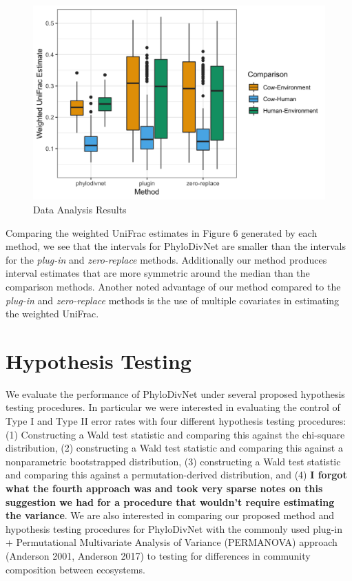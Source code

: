 \documentclass{article}
\newcommand*{\myfont}{\fontfamily{lmtt}\selectfont}
\begin{document}
\begin{figure}[!htb]
 \captionsetup{singlelinecheck = false, format= hang, justification = raggedright, font = sf, labelsep = space}
  \caption{Data Analysis Results}
  \centering
  \includegraphics[width=\textwidth]{HDWanalysis_plots_B100_3methods.png}
\end{figure}

Comparing the weighted UniFrac estimates in Figure 6 generated by each method, we see that the intervals for {\myfont PhyloDivNet} are smaller than the intervals for the \textit{plug-in} and \textit{zero-replace} methods. Additionally our method produces interval estimates that are more symmetric around the median than the comparison methods. Another noted advantage of our method compared to the \textit{plug-in} and \textit{zero-replace} methods is the use of multiple covariates in estimating the weighted UniFrac.

\section{Hypothesis Testing}
We evaluate the performance of PhyloDivNet under several proposed hypothesis testing procedures. In particular we were interested in evaluating the control of Type I and Type II error rates with four different hypothesis testing procedures: (1) Constructing a Wald test statistic and comparing this against the chi-square distribution, (2) constructing a Wald test statistic and comparing this against a nonparametric bootstrapped distribution, (3) constructing a Wald test statistic and comparing this against a permutation-derived distribution, and (4) \textbf{I forgot what the fourth approach was and took very sparse notes on this suggestion we had for a procedure that wouldn't require estimating the variance}. We are also interested in comparing our proposed method and hypothesis testing procedures for PhyloDivNet with the commonly used plug-in + Permutational Multivariate Analysis of Variance (PERMANOVA) approach (Anderson 2001, Anderson 2017) to testing for differences in community composition between ecosystems.
\end{document}
